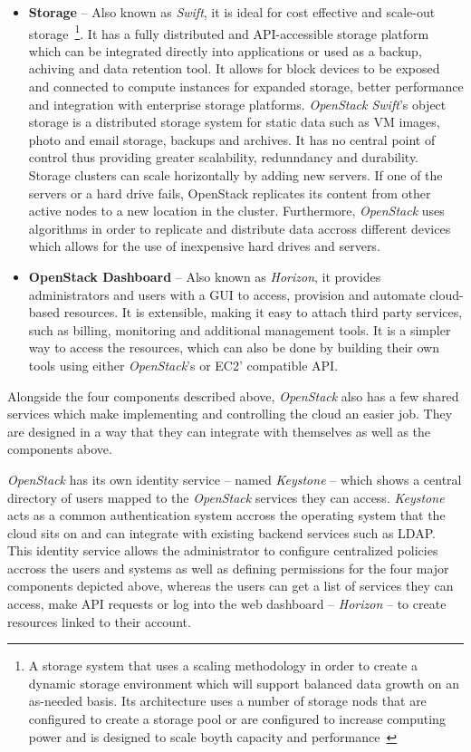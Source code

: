 \begin{itemize}
\item \textbf{Storage} -- Also known as \textit{Swift}, it is ideal for cost effective and scale-out storage~\footnote{A storage system that uses a scaling methodology in order to create a dynamic storage environment which will support balanced data growth on an as-needed basis. Its architecture uses a number of storage nods that are configured to create a storage pool or are configured to increase computing power and is designed to scale boyth capacity and performance~\cite{scaleout}}. It has a fully distributed and API-accessible storage platform which can be integrated directly into applications or used as a backup, achiving and data retention tool. It allows for block devices to be exposed and connected to compute instances for expanded storage, better performance and integration with enterprise storage platforms. \textit{OpenStack Swift}'s object storage is a distributed storage system for static data such as VM images, photo and email storage, backups and archives. It has no central point of control thus providing greater scalability, redunndancy and durability. Storage clusters can scale horizontally by adding new servers. If one of the servers or a hard drive fails, OpenStack replicates its content from other active nodes to a new location in the cluster. Furthermore, \textit{OpenStack} uses algorithms in order to replicate and distribute data accross different devices which allows for the use of inexpensive hard drives and servers.
\item \textbf{OpenStack Dashboard} -- Also known as \textit{Horizon}, it provides administrators and users with a GUI to access, provision and automate cloud-based resources. It is extensible, making it easy to attach third party services, such as billing, monitoring and additional management tools. It is a simpler way to access the resources, which can also be done by building their own tools using either \textit{OpenStack}'s or EC2' compatible API.
\end{itemize}

Alongside the four components described above, \textit{OpenStack} also has a few shared services which make implementing and controlling the cloud an easier job. They are designed in a way that they can integrate with themselves as well as the components above.

\textit{OpenStack} has its own identity service -- named \textit{Keystone} -- which shows a central directory of users mapped to the \textit{OpenStack} services they can access. \textit{Keystone} acts as a common authentication system accross the operating system that the cloud sits on and can integrate with existing backend services such as LDAP. This identity service allows the administrator to configure centralized policies accross the users and systems as well as defining permissions for the four major components depicted above, whereas the users can get a list of services they can access, make API requests or log into the web dashboard -- \textit{Horizon} -- to create resources linked to their account.

